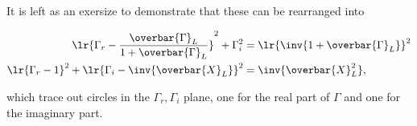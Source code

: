 It is left as an exersize to demonstrate that these can be rearranged into

\begin{equation}\label{eqn:uwavesDeck5SmithChartCore:440}
\begin{aligned}
\lr{ \Gamma_r - \frac{\overbar{\Gamma}_L}{1 + \overbar{\Gamma}_L } }^2 + \Gamma_i^2 &= \lr{ \inv{1 + \overbar{\Gamma}_L }}^2 \\
\lr{ \Gamma_r - 1 }^2 + \lr{ \Gamma_i - \inv{\overbar{X}_L } }^2 &= \inv{\overbar{X}_L^2},
\end{aligned}
\end{equation}

which trace out circles in the \( \Gamma_r, \Gamma_i \) plane, one for the real part of \( \Gamma \) and one for the imaginary part.


